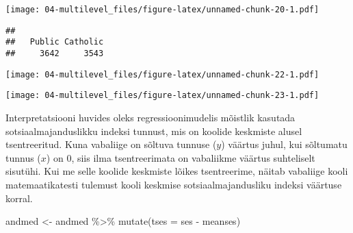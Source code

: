 \documentclass[
]{book}
\newenvironment{Shaded}{\begin{snugshade}}{\end{snugshade}}
\newcommand{\AttributeTok}[1]{\textcolor[rgb]{0.77,0.63,0.00}{#1}}
\newcommand{\FunctionTok}[1]{\textcolor[rgb]{0.00,0.00,0.00}{#1}}
\newcommand{\NormalTok}[1]{#1}
\newcommand{\OtherTok}[1]{\textcolor[rgb]{0.56,0.35,0.01}{#1}}
\newcommand{\SpecialCharTok}[1]{\textcolor[rgb]{0.00,0.00,0.00}{#1}}
\newcommand{\StringTok}[1]{\textcolor[rgb]{0.31,0.60,0.02}{#1}}
\begin{document}
\texttt{[image: 04-multilevel\_files/figure-latex/unnamed-chunk-20-1.pdf]}

\begin{Shaded}
\end{Shaded}

\begin{verbatim}
## 
##   Public Catholic 
##     3642     3543
\end{verbatim}

\begin{Shaded}
\end{Shaded}

\texttt{[image: 04-multilevel\_files/figure-latex/unnamed-chunk-22-1.pdf]}

\begin{Shaded}
\end{Shaded}

\texttt{[image: 04-multilevel\_files/figure-latex/unnamed-chunk-23-1.pdf]}

Interpretatsiooni huvides oleks regressioonimudelis mõistlik kasutada sotsiaalmajanduslikku indeksi tunnust, mis on koolide keskmiste alusel tsentreeritud. Kuna vabaliige on sõltuva tunnuse (\(y\)) väärtus juhul, kui sõltumatu tunnus (\(x\)) on 0, siis ilma tsentreerimata on vabaliikme väärtus suhteliselt sisutühi. Kui me selle koolide keskmiste lõikes tsentreerime, näitab vabaliige kooli matemaatikatesti tulemust kooli keskmise sotsiaalmajandusliku indeksi väärtuse korral.

\begin{Shaded}
\begin{Highlighting}[]
\NormalTok{andmed }\OtherTok{\textless{}{-}}\NormalTok{ andmed }\SpecialCharTok{\%\textgreater{}\%} 
  \FunctionTok{mutate}\NormalTok{(}\AttributeTok{tses =}\NormalTok{ ses }\SpecialCharTok{{-}}\NormalTok{ meanses)}
\end{Highlighting}
\end{Shaded}
\end{document}
